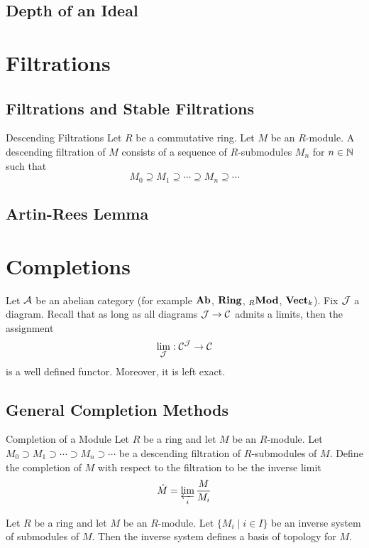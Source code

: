 \documentclass[a4paper]{article}
\begin{document}
\subsection{Depth of an Ideal}

\pagebreak
\section{Filtrations}
\subsection{Filtrations and Stable Filtrations}
\begin{defn}{Descending Filtrations}{} Let $R$ be a commutative ring. Let $M$ be an $R$-module. A descending filtration of $M$ consists of a sequence of $R$-submodules $M_n$ for $n\in\mathbb{N}$ such that $$M_0\supseteq M_1\supseteq\cdots\supseteq M_n\supseteq\cdots$$
\end{defn}

\subsection{Artin-Rees Lemma}

\pagebreak
\section{Completions}
Let $\mathcal{A}$ be an abelian category (for example $\bold{Ab}$, $\bold{Ring}$, ${_R\bold{Mod}}$, $\bold{Vect}_k$). Fix $\mathcal{J}$ a diagram. Recall that as long as all diagrams $\mathcal{J}\to\mathcal{C}$ admits a limits, then the assignment $$\lim_{\mathcal{J}}:\mathcal{C}^{\mathcal{J}}\to\mathcal{C}$$ is a well defined functor. Moreover, it is left exact. 

\subsection{General Completion Methods}
\begin{defn}{Completion of a Module}{} Let $R$ be a ring and let $M$ be an $R$-module. Let $M_0\supset M_1\supset\cdots\supset M_n\supset\cdots$ be a descending filtration of $R$-submodules of $M$. Define the completion of $M$ with respect to the filtration to be the inverse limit $$\hat{M}=\varprojlim_i\frac{M}{M_i}$$
\end{defn}

\begin{lmm}{}{} Let $R$ be a ring and let $M$ be an $R$-module. Let $\{M_i\;|\; i\in I\}$ be an inverse system of submodules of $M$. Then the inverse system defines a basis of topology for $M$. 
\end{lmm}
\end{document}
